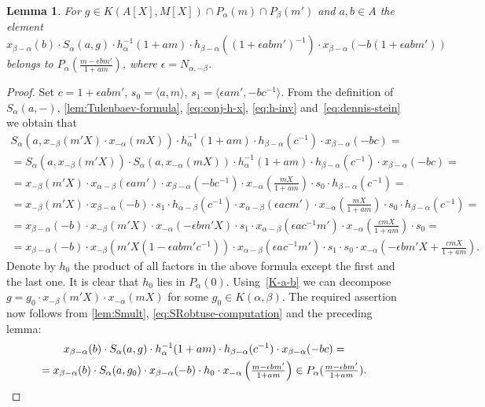 \documentclass[oneside, 8pt]{amsart}
\newtheorem{lemma}{Lemma}
\theoremstyle{remark}
\theoremstyle{definition}
\numberwithin{lemma}{section}
\numberwithin{prop}{section}
\numberwithin{corollary}{section}
\numberwithin{externaltheorem}{section}
\numberwithin{equation}{section}
\begin{document}
\begin{lemma} \label{SR:obtuse} For $g \in K(A[X], M[X]) \cap P_\alpha(m) \cap P_\beta(m')$ and $a, b\in A$ the element \[ x_{\beta - \alpha}(b) \cdot S_\alpha(a, g) \cdot h_{\alpha}^{-1}(1+am)\cdot h_{\beta - \alpha}((1 + \epsilon abm')^{-1})\cdot x_{\beta - \alpha}(-b(1 + \epsilon abm')) \]
 belongs to $P_\alpha\left(\tfrac{m - \epsilon bm'}{1+am}\right)$, where $\epsilon = N_{\alpha, -\beta}$.
\end{lemma}
\begin{proof} Set $c = 1 + \epsilon a b m'$, $s_0 = \langle a, m \rangle$, $s_1 = \langle \epsilon am', -bc^{-1} \rangle$.
From the definition of $S_\alpha(a, -)$, \cref{lem:Tulenbaev-formula}, \eqref{eq:conj-h-x}, \eqref{eq:h-inv} and~\eqref{eq:dennis-stein} we obtain that
 \begin{multline} \label{eq:SRobtuse-computation}
 S_\alpha\left(a, x_{-\beta}(m'X) \cdot x_{-\alpha}(mX)\right) \cdot h_{\alpha}^{-1}(1+am)\cdot h_{\beta-\alpha}(c^{-1})\cdot x_{\beta - \alpha}(-bc) = \\ 
 = S_\alpha(a, x_{-\beta}(m'X)) \cdot S_\alpha(a, x_{-\alpha}(mX)) \cdot h_\alpha^{-1} (1 + am) \cdot h_{\beta - \alpha}(c^{-1}) \cdot x_{\beta - \alpha}(-bc) = \\
 = x_{-\beta}(m'X) \cdot x_{\alpha - \beta}(\epsilon am') \cdot x_{\beta - \alpha}(-bc^{-1}) \cdot x_{-\alpha}\left(\tfrac{mX}{1+am}\right) \cdot s_0 \cdot h_{\beta - \alpha}(c^{-1}) = \\
 = x_{-\beta}(m'X) \cdot x_{\beta - \alpha}(-b) \cdot s_1 \cdot h_{\alpha-\beta}(c^{-1}) \cdot x_{\alpha-\beta}\left(\epsilon acm'\right) \cdot x_{-\alpha}\left(\tfrac{mX}{1+am}\right) \cdot s_0 \cdot h_{\beta - \alpha}(c^{-1}) = \\
 =  x_{\beta - \alpha}(-b) \cdot x_{-\beta}(m'X) \cdot x_{-\alpha}(-\epsilon bm'X) \cdot s_1 \cdot x_{\alpha-\beta}(\epsilon ac^{-1}m') \cdot x_{-\alpha}\left(\tfrac{cmX}{1+am}\right) \cdot s_0 = \\
 = x_{\beta-\alpha}(-b) \cdot x_{-\beta}\left(m'X(1 - \epsilon abm'c^{-1})\right) \cdot x_{\alpha-\beta}(\epsilon ac^{-1}m') \cdot s_1 \cdot s_0 \cdot x_{-\alpha}\left(-\epsilon bm' X + \tfrac{cmX}{1+am}\right).
\end{multline}
Denote by $h_0$ the product of all factors in the above formula except the first and the last one. It is clear that $h_0$ lies in $P_\alpha(0)$. Using~\cref{K-a-b} we can decompose $g = g_0 \cdot x_{-\beta}(m'X) \cdot x_{-\alpha}(mX)$ for some $g_0 \in K(\alpha, \beta)$. The required assertion now follows from \cref{lem:Smult}, \eqref{eq:SRobtuse-computation} and the preceding lemma:
\begin{multline} \nonumber
 x_{\beta - \alpha}(b) \cdot S_\alpha(a, g) \cdot h_{\alpha}^{-1}(1+am)\cdot h_{\beta - \alpha}(c^{-1})\cdot x_{\beta - \alpha}(-bc) = \\
  = x_{\beta - \alpha}(b) \cdot S_\alpha(a, g_0) \cdot x_{\beta-\alpha}(-b) \cdot h_0 \cdot x_{-\alpha}\left(\tfrac{m -\epsilon bm'}{1+am}\right) \in P_\alpha(\tfrac{m -\epsilon bm'}{1+am}). \qedhere
\end{multline}
\end{proof}
\end{document}
